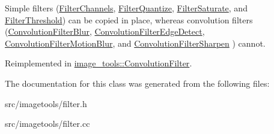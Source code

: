 Simple filters (\hyperlink{classimage__tools_1_1FilterChannels}{Filter\+Channels}, \hyperlink{classimage__tools_1_1FilterQuantize}{Filter\+Quantize}, \hyperlink{classimage__tools_1_1FilterSaturate}{Filter\+Saturate}, and \hyperlink{classimage__tools_1_1FilterThreshold}{Filter\+Threshold}) can be copied in place, whereas convolution filters (\hyperlink{classimage__tools_1_1ConvolutionFilterBlur}{Convolution\+Filter\+Blur}, \hyperlink{classimage__tools_1_1ConvolutionFilterEdgeDetect}{Convolution\+Filter\+Edge\+Detect}, \hyperlink{classimage__tools_1_1ConvolutionFilterMotionBlur}{Convolution\+Filter\+Motion\+Blur}, and \hyperlink{classimage__tools_1_1ConvolutionFilterSharpen}{Convolution\+Filter\+Sharpen} ) cannot. 

Reimplemented in \hyperlink{classimage__tools_1_1ConvolutionFilter_aef03779d74d96173880d93d06c7bd6b6}{image\+\_\+tools\+::\+Convolution\+Filter}.



The documentation for this class was generated from the following files\+:\begin{DoxyCompactItemize}
\item 
src/imagetools/filter.\+h\item 
src/imagetools/filter.\+cc\end{DoxyCompactItemize}
